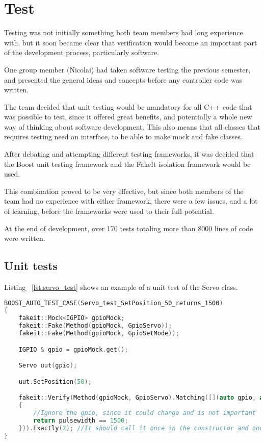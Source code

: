 \newpage
\chapter{Test}
Testing was not initially something both team members had long experience with, but it soon became clear that verification would become an important part of the development process, particularly software. 

One group member (Nicolai) had taken software testing the previous semester, and presented the general ideas and concepts before any controller code was written. 

The team decided that unit testing would be mandatory for all C++ code that was possible to test, since it offered great benefits, and potentially a whole new way of thinking about software development. This also means that all classes that requires testing need an interface, to be able to make mock and fake classes.

After debating and attempting different testing frameworks, it was decided that the Boost unit testing framework and the FakeIt isolation framework would be used. 

This combination proved to be very effective, but since both members of the team had no experience with either framework, there were a few issues, and a lot of learning, before the frameworks were used to their full potential.

At the end of development, over 170 tests totaling more than 8000 lines of code were written. 

\section{Unit tests}

Listing ~\ref{lst:servo_test} shows an example of a unit test of the Servo class.

\begin{lstlisting}[caption = {Servo test of SetPosition}, captionpos=b, label={lst:servo_test}, language=C++,firstnumber=1]
BOOST_AUTO_TEST_CASE(Servo_test_SetPosition_50_returns_1500)
{
	fakeit::Mock<IGPIO> gpioMock;
	fakeit::Fake(Method(gpioMock, GpioServo));
	fakeit::Fake(Method(gpioMock, GpioSetMode));

	IGPIO & gpio = gpioMock.get();

	Servo uut(gpio);

	uut.SetPosition(50);

	fakeit::Verify(Method(gpioMock, GpioServo).Matching([](auto gpio, auto pulsewidth)
	{
		//Ignore the gpio, since it could change and is not important
		return pulsewidth == 1500;
	})).Exactly(2); //It should call it once in the constructor and once again when we set it.
}
\end{lstlisting}

